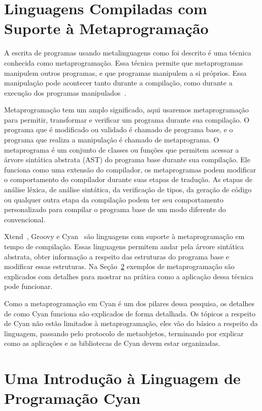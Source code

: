 \section{Linguagens Compiladas com Suporte à Metaprogramação}
\label{sec:metacompila}

A escrita de programas usando metalinguagens como foi descrito é uma técnica conhecida como metaprogramação. Essa técnica permite que metaprogramas manipulem outros programas, e que programas manipulem a si próprios. Essa manipulação pode acontecer tanto durante a compilação, como durante a execução dos programas manipulados~\cite{damavsevivcius2015taxonomy}.

Metaprogramação tem um amplo significado, aqui usaremos metaprogramação para permitir, transformar e verificar um programa durante sua compilação. O programa que é modificado ou validado é chamado de programa base, e o programa que realiza a manipulação é chamado de metaprograma. O metaprograma é um conjunto de classes ou funções que permitem acessar a árvore sintática abstrata (AST) do programa base durante sua compilação. Ele funciona como uma extensão do compilador, os metaprogramas podem modificar o comportamento do compilador durante suas etapas de tradução. As etapas de análise léxica, de análise sintática, da verificação de tipos, da geração de código ou qualquer outra etapa da compilação podem ter seu comportamento personalizado para compilar o programa base de um modo diferente do convencional.

Xtend~\cite{rentschler2014designing}, Groovy \cite{koenig2007groovy} e Cyan~\cite{guimaraes2013cyan} são linguagens com suporte à metaprogramação em tempo de compilação. Essas linguagens permitem andar pela árvore sintática abstrata, obter informação a respeito das estruturas do programa base e modificar essas estruturas. Na Seção~\ref{sec:intcyanlang} exemplos de metaprogramação são explicados com detalhes para mostrar na prática como a aplicação dessa técnica pode funcionar.

Como a metaprogramação em Cyan é um dos pilares dessa pesquisa, os detalhes de como Cyan funciona são explicados de forma detalhada. Os tópicos a respeito de Cyan não estão limitados à metaprogramação, eles vão do básico a respeito da linguagem, passando pelo protocolo de metaobjetos, terminando por explicar como as aplicações e as bibliotecas de Cyan devem estar organizadas.

\section{Uma Introdução à Linguagem de Programação Cyan} 
\label{sec:intcyanlang}


